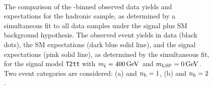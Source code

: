 \begin{figure}[t!]
  \begin{center}
     \\
    \caption{\label{fig:t2tt-best-fit-400}The comparison of
      the \scalht-binned observed data yields and expectations for the
      hadronic sample, as determined by a simultaneous fit to all data
      samples under the signal plus SM background hypothesis. The
      observed event yields in data (black dots), the SM expectations
      (dark blue solid line), and the signal expectations (pink solid
      line), as determined by the simultaneous fit, for the 
      signal model \texttt{T2tt} with $m_{\tilde{\rm t}} = 400\,\text{Ge\hspace{-.08em}V}$ and
      $m_{\text{LSP}} = 0\,\text{Ge\hspace{-.08em}V}$. Two event categories are
      considered: (a) \njethigh and $n_{\text{b}} = 1$, (b) \njethigh and
      $n_{\text{b}} = 2$.}
  \end{center}
\end{figure}
